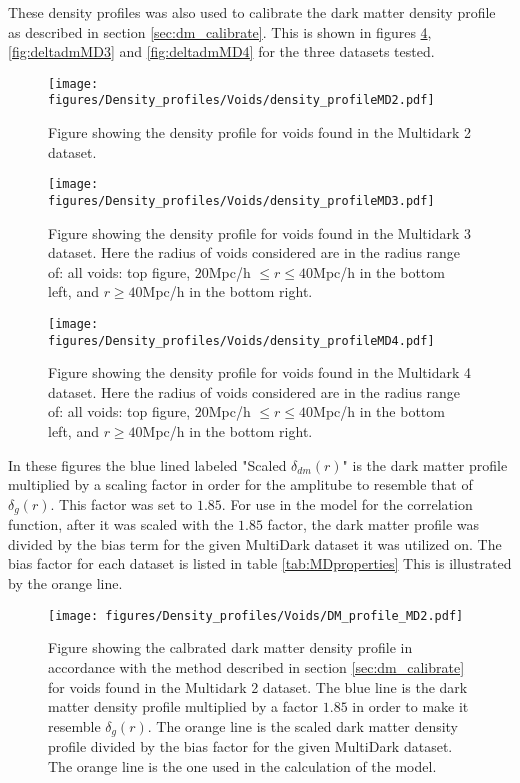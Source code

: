 These density profiles was also used to calibrate the dark matter density profile as described in section \ref{sec:dm_calibrate}. This is shown in figures \ref{fig:deltadmMD2}, \ref{fig:deltadmMD3} and \ref{fig:deltadmMD4} for the three datasets tested.
\begin{figure}[htbp]
    \texttt{[image: figures/Density\_profiles/Voids/density\_profileMD2.pdf]}
    \caption{Figure showing the density profile for voids found in the Multidark 2 dataset.}
    \label{fig:deltaMD2}
\end{figure}
\begin{figure}[htbp]
    \texttt{[image: figures/Density\_profiles/Voids/density\_profileMD3.pdf]}
    \caption{Figure showing the density profile for voids found in the Multidark 3 dataset. Here the radius of voids considered are in the radius range of: all voids: top figure, $20$Mpc/h $\leq r\leq 40$Mpc/h in the bottom left, and $r\geq 40$Mpc/h in the bottom right.}
    \label{fig:deltaMD3}
\end{figure}
\begin{figure}[htbp]
    \texttt{[image: figures/Density\_profiles/Voids/density\_profileMD4.pdf]}
    \caption{Figure showing the density profile for voids found in the Multidark 4 dataset. Here the radius of voids considered are in the radius range of: all voids: top figure, $20$Mpc/h $\leq r\leq 40$Mpc/h in the bottom left, and $r\geq 40$Mpc/h in the bottom right.}
    \label{fig:deltaMD4}
\end{figure}
In these figures the blue lined labeled "Scaled $\delta_{dm}(r)$" is the dark matter profile multiplied by a scaling factor in order for the amplitube to resemble that of $\delta_g(r)$. This factor was set to $1.85$. For use in the model for the correlation function, after it was scaled with the $1.85$ factor, the dark matter profile was divided by the bias term for the given MultiDark dataset it was utilized on. The bias factor for each dataset is listed in table \ref{tab:MDproperties} This is illustrated by the orange line. 
\begin{figure}[htbp]
    \texttt{[image: figures/Density\_profiles/Voids/DM\_profile\_MD2.pdf]}
    \caption{Figure showing the calbrated dark matter density profile in accordance with the method described in section \ref{sec:dm_calibrate} for voids found in the Multidark 2 dataset. The blue line is the dark matter density profile multiplied by a factor $1.85$ in order to make it resemble $\delta_g(r)$. The orange line is the scaled dark matter density profile divided by the bias factor for the given MultiDark dataset. The orange line is the one used in the calculation of the model.}
    \label{fig:deltadmMD2}
\end{figure}

